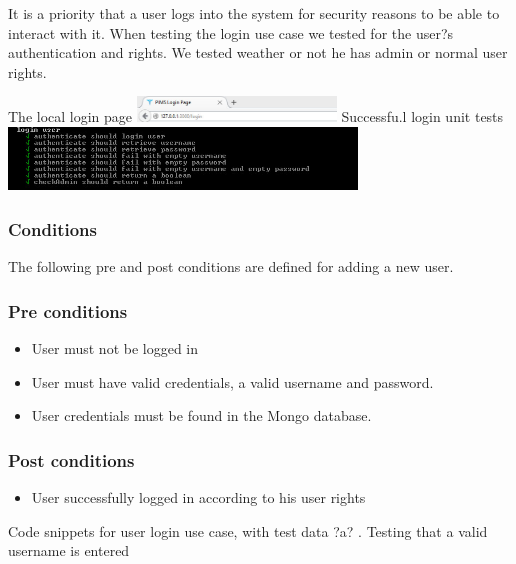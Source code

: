 
It is a priority that a user logs into the system for security reasons to be able to interact with it. When testing the login use case we tested for the user?s authentication and rights. We tested weather or not he has admin or normal user rights.

The local login page
\newline 
\newline 
\includegraphics[width=200px]{./Graphics/login}
\newline 
\newline 
Successfu.l login unit tests
\newline 
\newline 
\includegraphics[width=350px]{./Graphics/LoginTests}	
\subsubsection*{Conditions}
The following pre and post conditions are defined for adding a new user.
	
\subsubsection*{Pre conditions}	
\begin{itemize}
		\item User must not be logged in
		\item User must have valid credentials, a valid username and password.
		\item User credentials must be found in the Mongo database.
\end{itemize}	

\subsubsection*{Post conditions}	
\begin{itemize}
		\item User successfully logged in according to his user rights
\end{itemize}	

Code snippets for user login use case, with test data ?a? . Testing that a valid username is entered	

